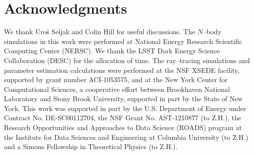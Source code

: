 \documentclass[reprint,aps,prd,superscriptaddress,showkeys,showpacs]{revtex4-1}
\begin{document}
\section*{Acknowledgments}
We thank Uro\v{s} Seljak and Colin Hill for useful discussions. The $N$--body simulations in this work were performed at National Energy Research Scientific Computing Center (NERSC). We thank the LSST Dark Energy Science Collaboration (DESC) for the allocation of time. The ray--tracing simulations and parameter estimation calculations were performed at the NSF XSEDE facility, supported by grant number ACI-1053575, and at the New York Center for Computational Sciences, a cooperative effort between Brookhaven National Laboratory and Stony Brook University, supported in part by the State of New York. This work was supported in part by the U.S. Department of Energy under Contract No. DE-SC00112704, the NSF Grant No. AST-1210877 (to Z.H.), the Research Opportunities and Approaches to Data Science (ROADS) program at the Institute for Data Sciences and Engineering at Columbia University (to Z.H.) and a Simons Fellowship in Theoretical Physics (to Z.H.).




\label{lastpage}
\end{document}
